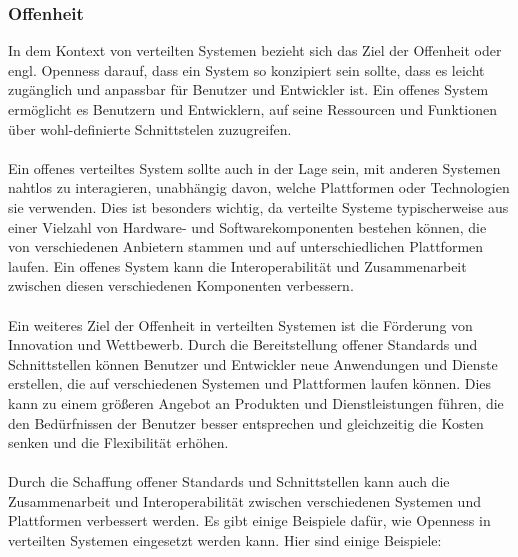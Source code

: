 \documentclass[../vs-script-first-v01.tex]{subfiles}
\begin{document}
\subsubsection{Offenheit}
In dem Kontext von verteilten Systemen bezieht sich das Ziel der Offenheit oder engl. Openness darauf, dass ein System so konzipiert sein sollte, dass es leicht zugänglich und anpassbar für Benutzer und Entwickler ist. Ein offenes System ermöglicht es Benutzern und Entwicklern, auf seine Ressourcen und Funktionen über wohl-definierte Schnittstelen zuzugreifen.
\\\\
Ein offenes verteiltes System sollte auch in der Lage sein, mit anderen Systemen nahtlos zu interagieren, unabhängig davon, welche Plattformen oder Technologien sie verwenden. Dies ist besonders wichtig, da verteilte Systeme typischerweise aus einer Vielzahl von Hardware- und Softwarekomponenten bestehen können, die von verschiedenen Anbietern stammen und auf unterschiedlichen Plattformen laufen. Ein offenes System kann die Interoperabilität und Zusammenarbeit zwischen diesen verschiedenen Komponenten verbessern.
\\\\
Ein weiteres Ziel der Offenheit in verteilten Systemen ist die Förderung von Innovation und Wettbewerb. Durch die Bereitstellung offener Standards und Schnittstellen können Benutzer und Entwickler neue Anwendungen und Dienste erstellen, die auf verschiedenen Systemen und Plattformen laufen können. Dies kann zu einem größeren Angebot an Produkten und Dienstleistungen führen, die den Bedürfnissen der Benutzer besser entsprechen und gleichzeitig die Kosten senken und die Flexibilität erhöhen.
\\\\
Durch die Schaffung offener Standards und Schnittstellen kann auch die Zusammenarbeit und Interoperabilität zwischen verschiedenen Systemen und Plattformen verbessert werden. Es gibt einige Beispiele dafür, wie Openness in verteilten Systemen eingesetzt werden kann. Hier sind einige Beispiele:
\end{document}
